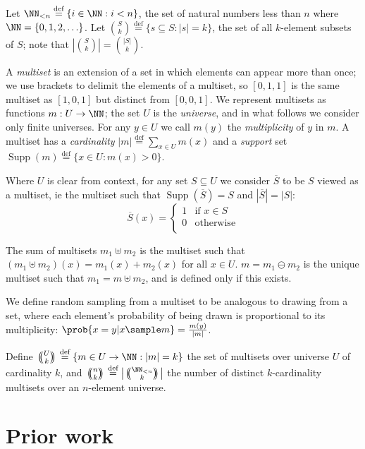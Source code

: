 \documentclass[letterpaper,luatex,11pt]{article}
\newcommand{\multichoose}[2]{
\left.\mathchoice
  {\left(\kern-0.48em\binom{#1}{#2}\kern-0.48em\right)}
  {\big(\kern-0.30em\binom{\smash{#1}}{\smash{#2}}\kern-0.30em\big)}
  {\left(\kern-0.30em\binom{\smash{#1}}{\smash{#2}}\kern-0.30em\right)}
  {\left(\kern-0.30em\binom{\smash{#1}}{\smash{#2}}\kern-0.30em\right)}
\right.}
\newcommand*{\defeq}{\stackrel{\text{def}}{=}}
\DeclareMathOperator{\Supp}{Supp}
\begin{document}
Let \(\NN_{<n} \defeq \{i \in \NN: i < n\}\), the set of natural numbers less than \(n\)
where \(\NN = \{0, 1, 2, \ldots\}\). 
Let \(\binom{S}{k} \defeq \{s \subseteq S: |s| = k\}\), the set of all \(k\)-element subsets
of \(S\); note that \(\left|\binom{S}{k}\right| = \binom{|S|}{k}\).

A \emph{multiset} is an extension of a set in which elements can appear more than once;
we use brackets to delimit the elements of a multiset, so
$[0, 1, 1]$ is the same multiset as $[1, 0, 1]$ but distinct from $[0, 0, 1]$.
We represent multisets as functions $m: U \rightarrow \NN$; the set $U$ is the \emph{universe},
and in what follows we consider only finite universes. For any $y \in U$ we call
$m(y)$ the \emph{multiplicity} of $y$ in $m$.
A multiset has a \emph{cardinality} $|m| \defeq \sum_{x \in U} m(x)$
and a \emph{support} set $\Supp(m) \defeq \{x \in U: m(x) > 0\}$.

Where $U$ is clear from context, for any set $S \subseteq U$ we consider
$\overline{S}$ to be $S$ viewed as a multiset, ie the multiset
such that $\Supp(\overline{S}) = S$ and $|\overline{S}| = |S|$:
\begin{displaymath}
    \overline{S}(x) =
    \begin{cases}
        1 & \text{if $x \in S$} \\
        0 & \text{otherwise} \\
    \end{cases}
\end{displaymath}

The sum of multisets $m_1 \uplus m_2$ is the multiset such that
$(m_1 \uplus m_2)(x) = m_1(x) + m_2(x)$ for all $x \in U$.
$m = m_1 \ominus m_2$ is the unique multiset such that $m_1 = m \uplus m_2$,
and is defined only if this exists.

We define random sampling from a multiset to be analogous to drawing from a set,
where each element's probability of being drawn is proportional to its multiplicity:
$\prob{x = y |x \sample m} = \frac{m(y)}{|m|}$.

Define $\multichoose{U}{k} \defeq \{m \in U \rightarrow \NN: |m| = k\}$ the set of multisets over
universe \(U\) of cardinality \(k\), and \(\multichoose{n}{k} \defeq \left|\multichoose{\NN_{<n}}{k}\right|\)
the number of distinct \(k\)-cardinality multisets over an \(n\)-element universe.

\section{Prior work}\label{priorwork}
\end{document}
